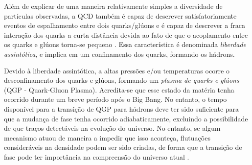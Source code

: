 


Além de explicar de uma maneira relativamente simples a diversidade de partículas observadas, a QCD também é capaz de descrever satisfatoriamente eventos de espalhamento entre dois quarks/glúons e é capaz de descrever a fraca interação dos quarks a curta distância devida ao fato de que o acoplamento entre os quarks e glúons torna-se pequeno \cite{GreinerQCDBook, Gross, Klevansky}. Essa característica é denominada \emph{liberdade assintótica}, e implica em um confinamento dos quarks, formando os hádrons.

Devido à liberdade assintótica, a altas pressões e/ou temperaturas ocorre o desconfinamento dos quarks e glúons, formando um \emph{plasma de quarks e glúons} (QGP - Quark-Gluon Plasma). Acredita-se que esse estado da matéria tenha ocorrido durante um breve período após o Big Bang. No entanto, o tempo disponível para a transição de QGP para hádrons deve ter sido suficiente para que a mudança de fase tenha ocorrido adiabaticamente, excluindo a possibilidade de que traços detectáveis na evolução do universo. No entanto, se algum mecanismo atuou de maneira a impedir que isso aconteça, flutuações consideráveis na densidade podem ser sido criadas, de forma que a transição de fase pode ter importância na compreensão do universo atual \cite{Mueller}.

